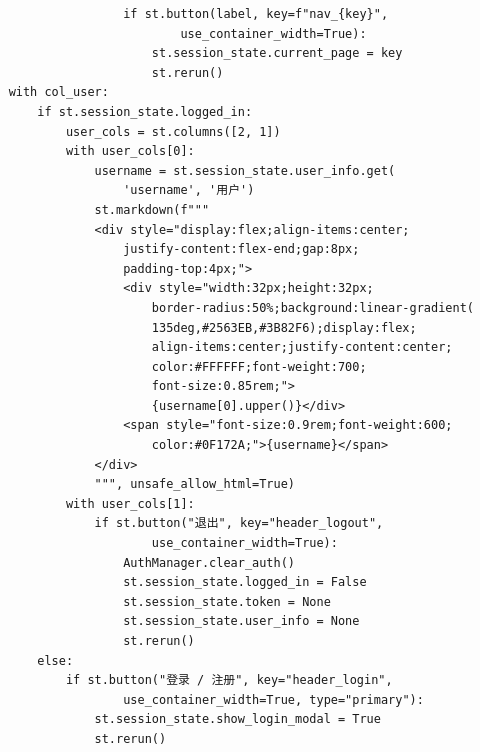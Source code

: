 \documentclass[a4paper,10pt]{article}
\begin{document}
\begin{lstlisting}
                    if st.button(label, key=f"nav_{key}",
                            use_container_width=True):
                        st.session_state.current_page = key
                        st.rerun()
    with col_user:
        if st.session_state.logged_in:
            user_cols = st.columns([2, 1])
            with user_cols[0]:
                username = st.session_state.user_info.get(
                    'username', '用户')
                st.markdown(f"""
                <div style="display:flex;align-items:center;
                    justify-content:flex-end;gap:8px;
                    padding-top:4px;">
                    <div style="width:32px;height:32px;
                        border-radius:50%;background:linear-gradient(
                        135deg,#2563EB,#3B82F6);display:flex;
                        align-items:center;justify-content:center;
                        color:#FFFFFF;font-weight:700;
                        font-size:0.85rem;">
                        {username[0].upper()}</div>
                    <span style="font-size:0.9rem;font-weight:600;
                        color:#0F172A;">{username}</span>
                </div>
                """, unsafe_allow_html=True)
            with user_cols[1]:
                if st.button("退出", key="header_logout",
                        use_container_width=True):
                    AuthManager.clear_auth()
                    st.session_state.logged_in = False
                    st.session_state.token = None
                    st.session_state.user_info = None
                    st.rerun()
        else:
            if st.button("登录 / 注册", key="header_login",
                    use_container_width=True, type="primary"):
                st.session_state.show_login_modal = True
                st.rerun()
\end{lstlisting}
\end{document}
